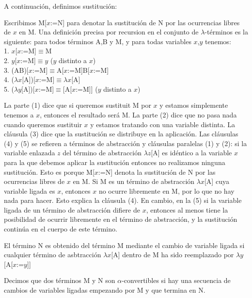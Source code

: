 A continuación, definimos sustitución:

\begin{definition}[Sustitución]
  Escribimos M[$x$:=N] para denotar la sustitución de N por las ocurrencias libres de $x$ en M. Una definición precisa por recursion en el conjunto de $\lambda$-términos es la siguiente: para todos términos A,B y M, y para todas variables $x$,$y$ tenemos:\\
  1. $x$[$x$:=M]$\equiv$M\\
  2. $y$[$x$:=M]$\equiv$$y$ ($y$ distinto a $x$)\\
  3. (AB)[$x$:=M]$\equiv$A[$x$:=M]B[$x$:=M]\\
  4. ($\lambda$$x$[A])[$x$:=M]$\equiv$$\lambda$$x$[A]\\
  5. ($\lambda$$y$[A])[$x$:=M]$\equiv$[A[$x$:=M]] ($y$ distinto a $x$)\\
\end{definition}

La parte (1) dice que si queremos sustituit M por $x$ y estamos simplemente tenemos a $x$, entonces el resultado será M. La parte (2) dice que no pasa nada cuando queremos sustituir $x$ y estamos tratando con una variable distinta. La cláusula (3) dice que la sustitución se distribuye en la aplicación. Las cláusulas (4) y (5) se refieren a términos de abstracción y cláusulas paralelas (1) y (2): si la variable enlazada $z$ del término de abstracción $\lambda$$z$[A] es idéntico a la variable $x$ para la que debemos aplicar la sustitución entonces no realizamos ninguna sustitución. Esto es porque M[$x$:=N] denota la sustitución de N por las ocurrencias libres de $x$ en M. Si M es un término de abstracción $\lambda$$x$[A] cuya variable ligada es $x$, entonces $x$ no ocurre libremente en M, por lo que no hay nada para hacer. Esto explica la cláusula (4). En cambio, en la (5) si la variable ligada de un término de abstracción difiere de $x$, entonces al menos tiene la posibilidad de ocurrir libremente en el término de abstracción, y la sustitución continúa en el cuerpo de este término.

\begin{definition}
  El término N es obtenido del término M mediante el cambio de variable ligada si cualquier término de asbtracción $\lambda$$x$[A] dentro de M ha sido reemplazado por $\lambda$$y$[A[$x$:=$y$]]
\end{definition}

Decimos que dos términos M y N son $\alpha$-convertibles si hay una secuencia de cambios de variables ligadas empezando por M y que termina en N.


